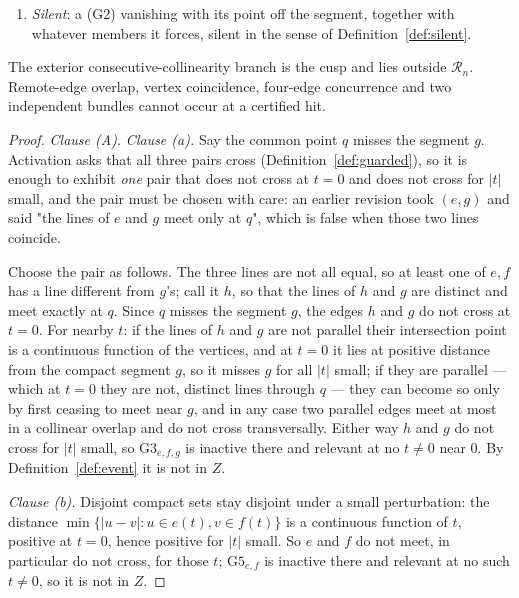 \begin{lemma}
\begin{enumerate}
\begin{enumerate}
the three (G4) members whose ties it forces, for three pairwise remote edges
concurrent in the interior of all three; wall (S2).
\item[(v)] \emph{Silent}: a (G2) vanishing with its point off the segment,
together with whatever members it forces, silent in the sense of
Definition~\ref{def:silent}.
\end{enumerate}
The exterior consecutive-collinearity branch is the cusp and lies outside
$\mathcal R_n$. Remote-edge overlap, vertex coincidence, four-edge
concurrence and two independent bundles cannot occur at a certified hit.
\end{enumerate}
\end{lemma}
\begin{proof}
\emph{Clause (A).} \emph{Clause (a).} Say the common point $q$ misses
the segment $g$. Activation asks that all
three pairs cross (Definition~\ref{def:guarded}), so it is enough to exhibit
\emph{one} pair that does not cross at $t=0$ and does not cross for $|t|$ small,
and the pair must be chosen with care: an earlier revision took $(e,g)$ and said
"the lines of $e$ and $g$ meet only at $q$", which is false when those two lines
coincide.

Choose the pair as follows. The three lines are not all equal, so at least one
of $e,f$ has a line different from $g$'s; call it $h$, so that the lines of $h$
and $g$ are distinct and meet exactly at $q$. Since $q$ misses the segment $g$,
the edges $h$ and $g$ do not cross at $t=0$. For nearby $t$: if the lines of $h$
and $g$ are not parallel their intersection point is a continuous function of
the vertices, and at $t=0$ it lies at positive distance from the compact segment
$g$, so it misses $g$ for all $|t|$ small; if they are parallel --- which at
$t=0$ they are not, distinct lines through $q$ --- they can become so only by
first ceasing to meet near $g$, and in any case two parallel edges meet at most
in a collinear overlap and do not cross transversally. Either way $h$ and $g$ do
not cross for $|t|$ small, so $\mathrm{G3}_{e,f,g}$ is inactive there and
relevant at no $t\neq0$ near $0$. By Definition~\ref{def:event} it is not in
$Z$.

\emph{Clause (b).} Disjoint compact sets stay disjoint under a small
perturbation: the
distance $\min\{|u-v|:u\in e(t),v\in f(t)\}$ is a continuous function of $t$,
positive at $t=0$, hence positive for $|t|$ small. So $e$ and $f$ do not meet,
in particular do not cross, for those $t$; $\mathrm{G5}_{e,f}$ is inactive
there and relevant at no such $t\neq0$, so it is not in $Z$.


\end{proof}
